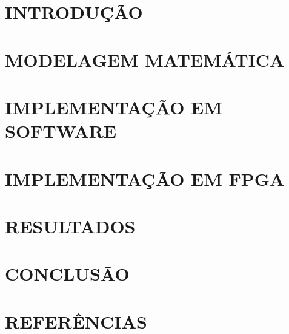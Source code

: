 \documentclass[twocolumn, a4paper]{article}
\begin{document}
\section{INTRODUÇÃO}


\section{MODELAGEM MATEMÁTICA}


\section{IMPLEMENTAÇÃO EM SOFTWARE} \label{sec:implsoft}


\section{IMPLEMENTAÇÃO EM FPGA}


\section{RESULTADOS}


\section{CONCLUSÃO}


\section*{REFERÊNCIAS}
\begingroup
\renewcommand{\section}[2]{}%
\end{document}
